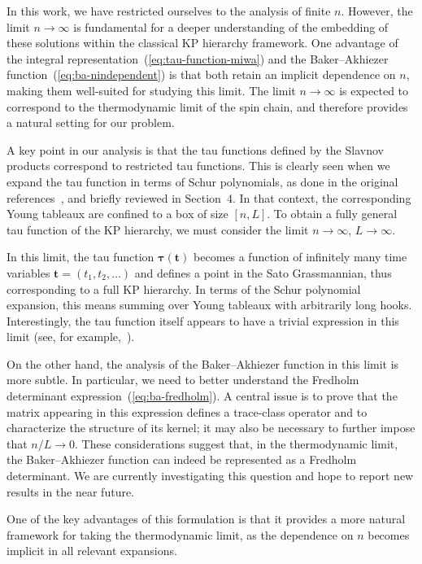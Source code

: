 \documentclass[a4paper,11pt]{amsart}
\begin{document}
\begin{remark}
In this work, we have restricted ourselves to the analysis of finite
\( n \). However, the limit \( n \to \infty \) is fundamental for a
deeper understanding of the embedding of these solutions within the
classical KP hierarchy framework. One advantage of the integral
representation~(\ref{eq:tau-function-miwa}) and the Baker--Akhiezer
function~(\ref{eq:ba-nindependent}) is that both retain an implicit
dependence on \( n \), making them well-suited for studying this
limit. The limit \( n \to \infty \) is expected to correspond to the
thermodynamic limit of the spin chain, and therefore provides a
natural setting for our problem.

A key point in our analysis is that the tau functions defined by the
Slavnov products correspond to restricted tau functions. This is
clearly seen when we expand the tau function in terms of Schur
polynomials, as done in the original references~\cite{Foda:2009zz,
  Wheeler:2010vmq, Foda:2010, Takasaki:2010qm, Foda:2012wn,
  Foda:2012wf}, and briefly reviewed in Section~4. In that context,
the corresponding Young tableaux are confined to a box of size \([n,
  L]\). To obtain a fully general tau function of the KP hierarchy, we
must consider the limit \( n \to \infty \), \( L \to \infty \).

In this limit, the tau function \( \bm{\tau}(\bm{t}) \) becomes a
function of infinitely many time variables \( \bm{t} = (t_1, t_2,
\dots) \) and defines a point in the Sato Grassmannian, thus
corresponding to a full KP hierarchy. In terms of the Schur polynomial
expansion, this means summing over Young tableaux with arbitrarily
long hooks. Interestingly, the tau function itself appears to have a
trivial expression in this limit (see, for
example,~\cite{Babbitt1990}). 

On the other hand, the analysis of the Baker--Akhiezer function in
this limit is more subtle. In particular, we need to better understand
the Fredholm determinant expression~(\ref{eq:ba-fredholm}). A central
issue is to prove that the matrix appearing in this expression defines
a trace-class operator and to characterize the structure of its
kernel; it may also be necessary to further impose that \( n / L \to 0
\). These considerations suggest that, in the thermodynamic limit, the
Baker--Akhiezer function can indeed be represented as a Fredholm
determinant. We are currently investigating this question and hope to
report new results in the near future.

One of the key advantages of this formulation is that it provides a
more natural framework for taking the thermodynamic limit, as the
dependence on \( n \) becomes implicit in all relevant expansions.
\end{remark}
\end{document}
